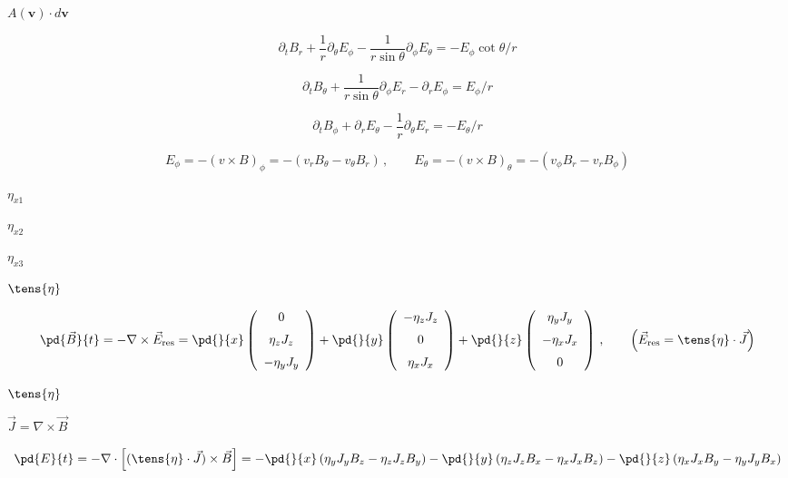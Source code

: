 \documentclass{article}
\begin{document}
$ A(\mathbf{v})\cdot 
d\mathbf{v} $
\pagebreak

\[ \partial_tB_r + \frac{1}{r}\partial_\theta E_\phi
   - \frac{1}{r\sin\theta}\partial_\phi E_\theta = -E_\phi\cot\theta/r \]
\pagebreak

\[ \partial_t B_\theta + \frac{1}{r\sin\theta}\partial_\phi E_r
   - \partial_rE_\phi =   E_\phi/r \]
\pagebreak

\[ \partial_t B_\phi + \partial_r E_\theta 
   - \frac{1}{r}\partial_\theta E_r = - E_\theta/r\]
\pagebreak

\[ E_\phi   = -(v \times B)_\phi   = - (v_r B_\theta - v_\theta B_r) 
    \,,\qquad
     E_\theta = -(v \times B)_\theta = - (v_\phi B_r    - v_r B_\phi) \]
\pagebreak

$ \eta_{x1}$
\pagebreak

$ \eta_{x2}$
\pagebreak

$ \eta_{x3}$
\pagebreak

$ \tens{\eta}$
\pagebreak

\[
   \pd{\vec{B}}{t} = - \nabla\times{\vec{E}_{\rm res}} =
    \pd{}{x}\left(\begin{array}{c}
     0           \\ \noalign{\medskip}
     \eta_z J_z  \\ \noalign{\medskip}
   - \eta_y J_y \end{array}\right)
     +
    \pd{}{y}\left(\begin{array}{c}
   - \eta_z J_z  \\ \noalign{\medskip}
         0       \\ \noalign{\medskip}
     \eta_x J_x \end{array}\right)
      +
    \pd{}{z}\left(\begin{array}{c}
      \eta_y J_y \\ \noalign{\medskip}
     -\eta_x J_x \\ \noalign{\medskip}
          0    \end{array}\right)      
     \,,\qquad
   \left(\vec{E}_{\rm res} = \tens{\eta}\cdot\vec{J}\right)
\]
\pagebreak

$\tens{\eta}$
\pagebreak

$\vec{J} = \nabla\times\vec{B}$
\pagebreak

\[
  \pd{E}{t} = -\nabla\cdot\Big[(\tens{\eta}\cdot\vec{J})\times\vec{B}\Big]
            = - \pd{}{x}\left(\eta_yJ_yB_z - \eta_zJ_zB_y\right)
              - \pd{}{y}\left(\eta_zJ_zB_x - \eta_xJ_xB_z\right)
              - \pd{}{z}\left(\eta_xJ_xB_y - \eta_yJ_yB_x\right)
\]
\pagebreak
\end{document}
